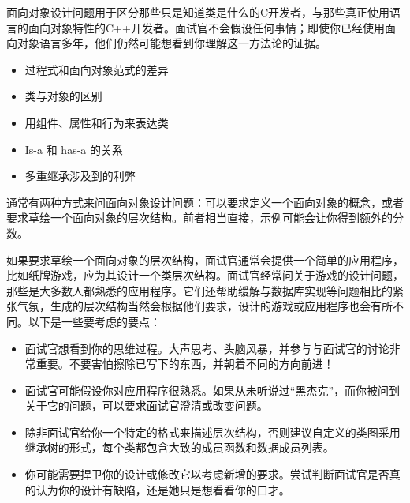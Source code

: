 
面向对象设计问题用于区分那些只是知道类是什么的C开发者，与那些真正使用语言的面向对象特性的C++开发者。面试官不会假设任何事情；即使你已经使用面向对象语言多年，他们仍然可能想看到你理解这一方法论的证据。


\begin{itemize}
\item
过程式和面向对象范式的差异

\item
类与对象的区别

\item
用组件、属性和行为来表达类

\item
Is-a 和 has-a 的关系

\item
多重继承涉及到的利弊
\end{itemize}


通常有两种方式来问面向对象设计问题：可以要求定义一个面向对象的概念，或者要求草绘一个面向对象的层次结构。前者相当直接，示例可能会让你得到额外的分数。

如果要求草绘一个面向对象的层次结构，面试官通常会提供一个简单的应用程序，比如纸牌游戏，应为其设计一个类层次结构。面试官经常问关于游戏的设计问题，那些是大多数人都熟悉的应用程序。它们还帮助缓解与数据库实现等问题相比的紧张气氛，生成的层次结构当然会根据他们要求，设计的游戏或应用程序也会有所不同。以下是一些要考虑的要点：

\begin{itemize}
\item
面试官想看到你的思维过程。大声思考、头脑风暴，并参与与面试官的讨论非常重要。不要害怕擦除已写下的东西，并朝着不同的方向前进！

\item
面试官可能假设你对应用程序很熟悉。如果从未听说过“黑杰克”，而你被问到关于它的问题，可以要求面试官澄清或改变问题。

\item
除非面试官给你一个特定的格式来描述层次结构，否则建议自定义的类图采用继承树的形式，每个类都包含大致的成员函数和数据成员列表。

\item
你可能需要捍卫你的设计或修改它以考虑新增的要求。尝试判断面试官是否真的认为你的设计有缺陷，还是她只是想看看你的口才。
\end{itemize}















